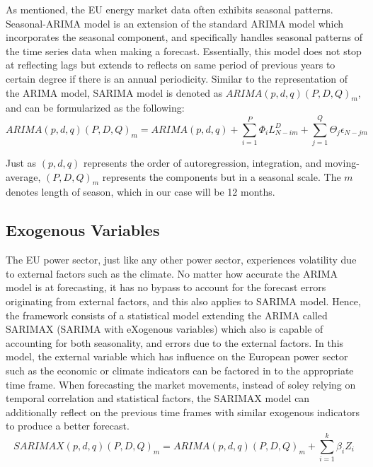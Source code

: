 \documentclass[]{usiinfbachelorproject}
\begin{document}
As mentioned, the EU energy market data often exhibits seasonal patterns. Seasonal-ARIMA model is an extension of the standard ARIMA model which incorporates the seasonal component, and specifically handles seasonal patterns of the time series data when making a forecast. Essentially, this model does not stop at reflecting lags but extends to reflects on same period of previous years to certain degree if there is an annual periodicity. Similar to the representation of the ARIMA model, SARIMA model is denoted as ${ARIMA(p,d,q)(P,D,Q)_m}$, and can be formularized as the following: \\ 

\begin{equation}
    ARIMA(p,d,q)(P,D,Q)_m = ARIMA(p,d,q) + \sum_{i=1}^{P}\Phi_i L_{N - im}^{D} + \sum_{j=1}^{Q}\Theta_j \epsilon_{N - jm}  
\end{equation} 

Just as ${(p, d, q)}$ represents the order of autoregression,
integration, and moving-average, ${(P, D, Q)_m}$ represents the components but in a seasonal scale. The ${m}$ denotes length of season, which in our case will be 12 months. \\

\subsection{Exogenous Variables}

The EU power sector, just like any other power sector, experiences
volatility due to external factors such as the climate. No matter how
accurate the ARIMA model is at forecasting, it has no bypass to
account for the forecast errors originating from external factors,
and this also applies to SARIMA model. Hence, the framework consists of a statistical model extending the ARIMA called SARIMAX
(SARIMA with eXogenous variables) which also is capable of accounting for both seasonality, and errors due to the external factors. In this model, the external variable which has influence on the European power sector such as the economic or climate indicators
can be factored in to the appropriate time frame. When forecasting
the market movements, instead of soley relying on temporal correlation and statistical factors, the SARIMAX model can additionally reflect on the previous time frames with similar exogenous indicators to produce a better forecast. \\

\begin{equation}
    SARIMAX(p,d,q)(P,D,Q)_m = ARIMA(p,d,q)(P,D,Q)_m + \sum_{i=1}^{k}\beta_i Z_{i}
\end{equation} 
\end{document}

